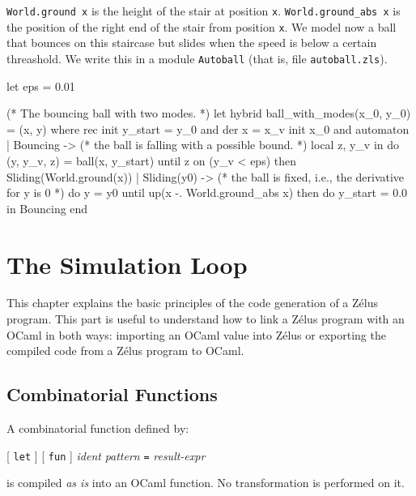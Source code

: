 \documentclass[11pt,titlepage,twoside]{report}
\newcommand{\zelus}{{\sf Z\'elus}}
\newcommand{\ocaml}{{\sf OCaml}}
\newcommand{\term}[1]{{\tt #1}}
\newcommand{\nterm}[1]{{\em #1}}
\begin{document}
\verb-World.ground x- is the height of the stair at position
\verb-x-. \verb-World.ground_abs x- is the position of the right end of the
stair from position \verb-x-. We model now a ball that bounces on this
staircase but slides when the speed is below a certain threashold. We
write this in a module \verb-Autoball- (that is, file
\verb-autoball.zls-).

\begin{runverbatim}
let eps = 0.01

(* The bouncing ball with two modes. *)
let hybrid ball_with_modes(x_0, y_0) = (x, y) where
  rec init y_start = y_0 
  and der x = x_v init x_0
  and automaton
      | Bouncing ->
         (* the ball is falling with a possible bound. *)
         local z, y_v in
         do (y, y_v, z) = ball(x, y_start)
         until z on (y_v < eps) then Sliding(World.ground(x))
      | Sliding(y0) ->
         (* the ball is fixed, i.e., the derivative for y is 0 *)
         do 
           y = y0 
         until up(x -. World.ground_abs x)
         then do y_start = 0.0 in Bouncing
      end
\end{runverbatim}

\chapter{The Simulation Loop}
\label{chapter:simulation-loop}

This chapter explains the basic principles of the code generation of a \zelus{}
program. This part is useful to understand how to link a \zelus{} program
with an \ocaml{} in both ways: importing an \ocaml{} value into \zelus{}
or exporting the compiled code from a \zelus{} program to \ocaml.

\section{Combinatorial Functions}
A combinatorial function defined by:
\begin{center}
  [ \term{let} ] [ \term{fun} ] \nterm{ident} \nterm{pattern} \term{=}
  \nterm{result-expr}
\end{center}

is compiled \emph{as is} into an \ocaml{} function. No transformation is
performed on it.
\end{document}
